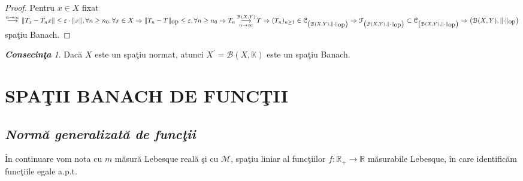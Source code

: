 \documentclass[ a4paper, 12pt]{report}
\theoremstyle{remark}
\newtheorem{cons}{\bf Consecin\c ta }[section]
\numberwithin{equation}{section}
\begin{document}
\begin{proof}
Pentru $x \in X$ fixat $\stackrel{n \rightarrow \infty}{\longrightarrow}  \lVert T_x - T_n x \rVert \leq \varepsilon \cdot  \lVert x \rVert, \forall n \geq n_0, \forall x \in X \Rightarrow  \lVert T_n - T \rVert_{\mbox{op}} \leq \varepsilon, \forall n \geq n_0 \Rightarrow T_n \pound\limits_{n \rightarrow \infty}^{\mathcal{B}(X,Y)} T \Rightarrow (T_n)_{n \geq 1} \in \mathcal{C}_{\left( \mathcal{B}(X,Y),  \lVert \cdot \rVert_{\mbox{op}}\right)} \Rightarrow \mathcal{F}_{\left( \mathcal{B}(X,Y),  \lVert \cdot \rVert_{\mbox{op}}\right)} \subset \mathcal{C}_{\left( \mathcal{B}(X,Y),  \lVert \cdot \rVert_{\mbox{op}}\right)} \Rightarrow \left( \mathcal{B}(X,Y),  \lVert \cdot \rVert_{\mbox{op}}\right) $ spa\c tiu Banach.



\end{proof}
\begin{cons}
Dac\u a $X$ este un spa\c tiu normat, atunci $X^{'} = \mathcal{B}(X,\mathbb{K})$ este un spa\c tiu Banach.
\end{cons}








\newpage
\chapter{SPA\c TII BANACH DE FUNC\c TII}
\vspace{5mm}

\section{\textit{Norm\u a generalizat\u a de func\c tii}}

\^ In continuare vom nota cu $m$ m\u asur\u a Lebesque real\u a \c si cu $\mathcal{M}$, spa\c tiu liniar al func\c tiilor $f : \mathbb{R}_+ \rightarrow \mathbb{R}$ m\u asurabile Lebesque, \^in care identific\u am func\c tiile egale a.p.t.
\end{document}
